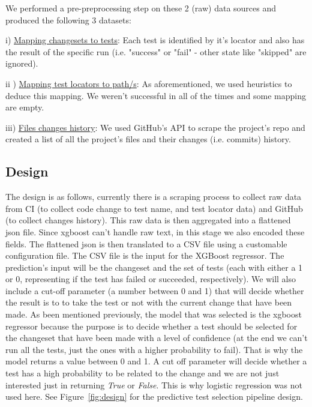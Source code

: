 \documentclass{article}
\begin{document}
We performed a pre-preprocessing step on these 2 (raw) data sources and produced the following 3 datasets:

i) \underline{Mapping changesets to tests}: Each test is identified by it's locator and also has the result of the specific run (i.e. "success" or "fail" - other state like "skipped" are ignored).

ii ) \underline{Mapping test locators to path/s}: As aforementioned, we used heuristics to deduce this mapping. We weren't successful in all of the times and some mapping are empty.

iii) \underline{Files changes history}: We used GitHub's API to scrape the project's repo and created a list of all the project's files and their changes (i.e. commits) history.

\subsection{Design}
The design is as follows, currently there is a scraping process to collect raw data from CI (to collect code change to test name, and test locator data) and GitHub (to collect changes history). This raw data is then aggregated into a flattened json file. Since xgboost can't handle raw text, in this stage we also encoded these fields. The flattened json is then translated to a CSV file using a customable configuration file. The CSV file is the input for the XGBoost regressor. The prediction's input  will be the changeset and the set of tests (each with either a 1 or 0, representing if the test has failed or succeeded, respectively). We will also include a cut-off parameter (a number between 0 and 1) that will decide whether the result is to to take the test or not with the current change that have been made. 
As been mentioned previously, the model that was selected is the xgboost regressor because the purpose is to decide whether a test should be selected for the changeset that have been made with a level of confidence (at the end we can't run all the tests, just the ones with a higher probability to fail). That is why the model returns a value between 0 and 1. A cut off parameter will decide whether a test has a high probability to be related to the change and we are not just interested just in returning \textit{True} or \textit{False}. This is why logistic regression was not used here.  
See Figure~\ref{fig:design} for the predictive test selection pipeline design.
\end{document}
